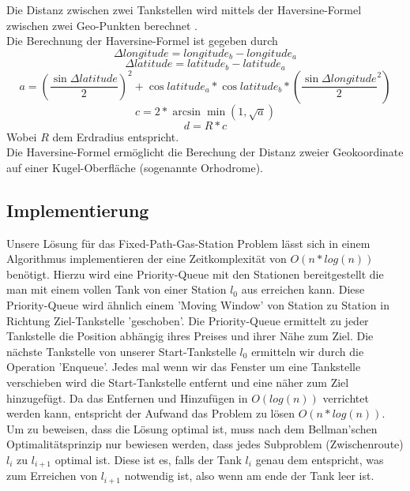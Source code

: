 \documentclass[
ngerman          %
,a4paper          %
,11pt
,pdftex
]{report}
\begin{document}
Die Distanz zwischen zwei Tankstellen wird mittels der Haversine-Formel zwischen zwei Geo-Punkten berechnet \cite{haversine}.\\
Die Berechnung der Haversine-Formel ist gegeben durch
$$ \Delta longitude = longitude_b - longitude_a $$
$$ \Delta latitude = latitude_b - latitude_a $$
$$ a = (\frac{\sin \Delta latitude}{2})^2 + \cos latitude_a * \cos latitude_b * (\frac{\sin \Delta longitude}{2}^2)$$
$$ c = 2 * \arcsin \min(1,\sqrt{a})$$
$$ d = R * c $$
Wobei $R$ dem Erdradius entspricht.\\
Die Haversine-Formel ermöglicht die Berechung der Distanz zweier Geokoordinate auf einer Kugel-Oberfläche (sogenannte Orhodrome).

\subsection{Implementierung}

Unsere Lösung für das Fixed-Path-Gas-Station Problem lässt sich in einem Algorithmus implementieren der eine Zeitkomplexität von $O(n*log (n))$ benötigt\cite{fixedgas}. Hierzu wird eine Priority-Queue mit den Stationen bereitgestellt die man mit einem vollen Tank von einer Station $l_0$ aus erreichen kann.
Diese Priority-Queue wird ähnlich einem 'Moving Window' von Station zu Station in Richtung Ziel-Tankstelle 'geschoben'.
Die Priority-Queue ermittelt zu jeder Tankstelle die Position abhängig ihres Preises und ihrer Nähe zum Ziel.
Die nächste Tankstelle von unserer Start-Tankstelle $l_0$ ermitteln wir durch die Operation 'Enqueue'.
Jedes mal wenn wir das Fenster um eine Tankstelle verschieben wird die Start-Tankstelle entfernt und eine näher zum Ziel hinzugefügt. Da das Entfernen und Hinzufügen in $O(log (n))$ verrichtet werden kann\cite{queue}, entspricht der Aufwand das Problem zu lösen $O(n*log (n))$. Um zu beweisen, dass die Lösung optimal ist, muss nach dem Bellman'schen Optimalitätsprinzip\cite{bellman} nur bewiesen werden, dass jedes Subproblem (Zwischenroute) $l_i$ zu $l_{i+1}$ optimal ist. Diese ist es, falls der Tank $l_i$ genau dem entspricht, was zum Erreichen von $l_{i+1}$ notwendig ist, also wenn am ende der Tank leer ist.
\end{document}
